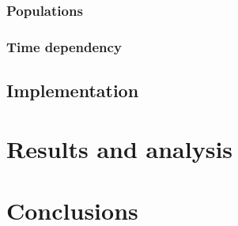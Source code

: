 \documentclass[10pt,a4paper]{article}
\begin{document}
\subsubsection{Populations}

\subsubsection{Time dependency}

\subsection{Implementation}

\section{Results and analysis}

\section{Conclusions}




\newpage

\begin{appendices}


\end{appendices}



\end{document}
